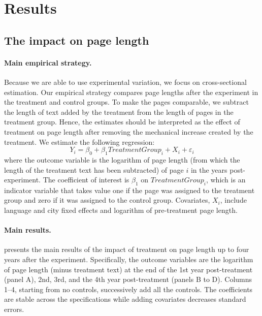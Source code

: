 \documentclass[12pt]{article}
\begin{document}
\section{Results}\label{S:Results}
\subsection{The impact on page length} \label{S:ImpactOnOutcomes}

\paragraph{Main empirical strategy.}
Because we are able to use experimental variation, we focus on cross-sectional estimation.
Our empirical strategy compares page lengths after the experiment in the treatment and control groups.
To make the pages comparable, we subtract the length of text added by the treatment from the length of pages in the treatment group.
Hence, the estimates should be interpreted as the effect of treatment on page length after removing the mechanical increase created by the treatment.
We estimate the following regression:
\begin{equation}\label{E:CrossSectionRegression}
Y_i = \beta_0 + \beta_1 TreatmentGroup_i + X_i +\varepsilon_i
\end{equation}
where the outcome variable is the logarithm of page length (from which the length of the treatment text has been subtracted) of page $i$ in the years post-experiment. The coefficient of interest is $\beta_1$ on $TreatmentGroup_i$, which is an indicator variable that takes value one if the page was assigned to the treatment group and zero if it was assigned to the control group. Covariates, $X_i$, include language and city fixed effects and logarithm of pre-treatment page length.

\paragraph{Main results.}  presents the main results of the impact of treatment on page length up to four years after the experiment. Specifically, the outcome variables are the logarithm of page length (minus treatment text) at the end of the 1st year post-treatment (panel A), 2nd, 3rd, and the 4th year post-treatment (panels B to D). Columns 1--4, starting from no controls, successively add all the controls. The coefficients are stable across the specifications while adding covariates decreases standard errors. 
\end{document}
